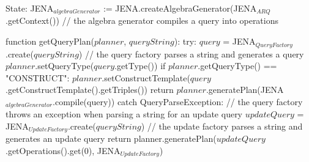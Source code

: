State:
    JENA$_{algebraGenerator}$ := JENA.createAlgebraGenerator(JENA$_{ARQ}$.getContext()) // the algebra generator compiles a query into operations

function getQueryPlan($planner$, $queryString$):
    try: 
        $query$ = JENA$_{QueryFactory}$.create($queryString$) // the query factory parses a string and generates a query
        $planner$.setQueryType($query$.getType())
        if $planner$.getQueryType() == "CONSTRUCT":
            $planner$.setConstructTemplate($query$.getConstructTemplate().getTriples())
        return $planner$.generatePlan(JENA$_{algebraGenerator}$.compile(query))
    catch QueryParseException: // the query factory throws an exception when parsing a string for an update query                                                        
        $updateQuery$ = JENA$_{UpdateFactory}$.create($queryString$) // the update factory parses a string and generates an update query
        return planner.generatePlan($updateQuery$.getOperations().get(0), JENA$_{UpdateFactory}$)